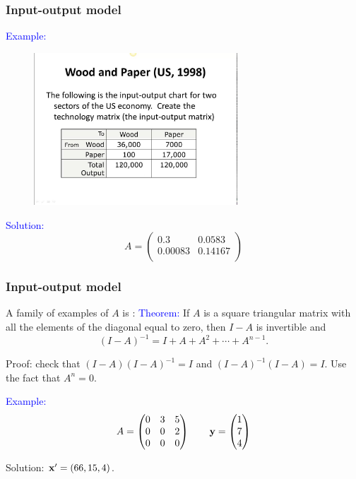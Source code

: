 \documentclass[11pt,aspectratio=169]{beamer}
\begin{document}
\begin{frame}
\frametitle{Input-output model}
\begin{small}
\textcolor{blue}{Example:}  
\end{small}
\begin{figure}
\includegraphics[width=3in]{img/io} 
\end{figure}
\begin{small}
\textcolor{blue}{Solution:}  \begin{equation*} 
 A=\begin{pmatrix}
0.3 & 0.0583\\
0.00083 & 0.14167\\
\end{pmatrix}
\end{equation*}
\end{small}
\end{frame}
\begin{frame}
\frametitle{Input-output model}
\begin{small}
 A family of examples of $A$ is :
 \vskip 10pt
\textcolor{blue}{Theorem:} If $A$ is a square triangular matrix with all the elements of the diagonal equal to zero, then $I-A$ is invertible and
$$
(I-A)^{-1}=I+A+A^2+\cdots+A^{n-1}.
$$

\begin{tiny}Proof: check that $(I-A)(I-A)^{-1}=I$ and $(I-A)^{-1}(I-A)=I$. Use  the fact that $A^n=0$.\end{tiny}
\vskip 12pt
 \textcolor{blue}{Example:}  \begin{equation*} 
 A=\begin{pmatrix}
0 & 3 & 5\\
0 & 0 & 2 \\
0 & 0 & 0
\end{pmatrix}\qquad
\bf{y}= \begin{pmatrix}
1\\
7 \\
4
\end{pmatrix}
\end{equation*}

Solution: ${\bf x}'=(66,15, 4)$.

\end{small}
\end{frame}
\end{document}
